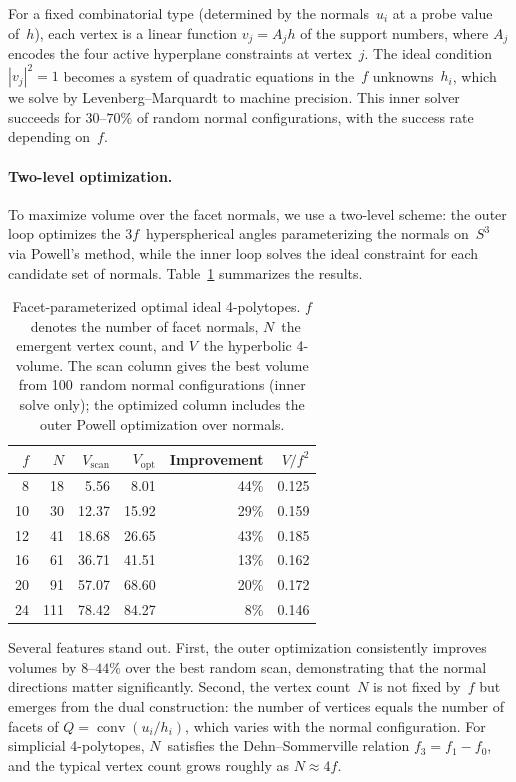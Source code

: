 \documentclass[11pt]{article}
\begin{document}
For a fixed combinatorial type (determined by the normals~$u_i$
at a probe value of~$h$), each vertex is a linear function
$v_j = A_j h$ of the support numbers, where $A_j$ encodes the
four active hyperplane constraints at vertex~$j$.  The ideal
condition $|v_j|^2 = 1$ becomes a system of quadratic equations
in the~$f$ unknowns~$h_i$, which we solve by Levenberg--Marquardt
to machine precision.  This inner solver succeeds for $30$--$70\%$
of random normal configurations, with the success rate depending
on~$f$.

\paragraph{Two-level optimization.}
To maximize volume over the facet normals, we use a two-level
scheme: the outer loop optimizes the $3f$~hyperspherical angles
parameterizing the normals on~$S^3$ via Powell's method, while
the inner loop solves the ideal constraint for each candidate
set of normals.  Table~\ref{tab:facet_opt} summarizes the results.

\begin{table}[t]
\centering
\caption{Facet-parameterized optimal ideal 4-polytopes.
$f$~denotes the number of facet normals, $N$~the emergent vertex
count, and $V$~the hyperbolic 4-volume.  The scan column gives
the best volume from 100~random normal configurations (inner solve
only); the optimized column includes the outer Powell
optimization over normals.}
\label{tab:facet_opt}
\smallskip
\begin{tabular}{@{}rrrrrr@{}}
\toprule
$f$ & $N$ & $V_{\mathrm{scan}}$ & $V_{\mathrm{opt}}$
    & Improvement & $V/f^2$ \\
\midrule
 8  &  18 &  5.56 &   8.01 & 44\% & 0.125 \\
10  &  30 & 12.37 &  15.92 & 29\% & 0.159 \\
12  &  41 & 18.68 &  26.65 & 43\% & 0.185 \\
16  &  61 & 36.71 &  41.51 & 13\% & 0.162 \\
20  &  91 & 57.07 &  68.60 & 20\% & 0.172 \\
24  & 111 & 78.42 &  84.27 &  8\% & 0.146 \\
\bottomrule
\end{tabular}
\end{table}

Several features stand out.  First, the outer optimization
consistently improves volumes by $8$--$44\%$ over the best
random scan, demonstrating that the normal directions matter
significantly.  Second, the vertex count~$N$ is not fixed by~$f$
but emerges from the dual construction: the number of vertices
equals the number of facets of $Q = \operatorname{conv}(u_i/h_i)$,
which varies with the normal configuration.  For simplicial
4-polytopes, $N$~satisfies the Dehn--Sommerville relation
$f_3 = f_1 - f_0$, and the typical vertex count grows roughly
as $N \approx 4f$.
\end{document}
